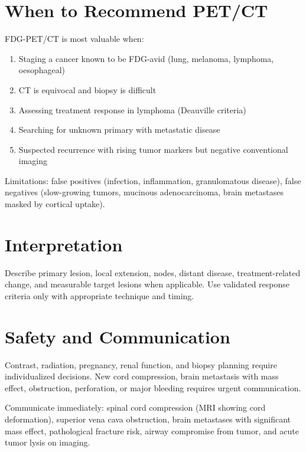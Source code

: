 \section{When to Recommend PET/CT}
FDG-PET/CT is most valuable when:
\begin{enumerate}
  \item Staging a cancer known to be FDG-avid (lung, melanoma, lymphoma, oesophageal)
  \item CT is equivocal and biopsy is difficult
  \item Assessing treatment response in lymphoma (Deauville criteria)
  \item Searching for unknown primary with metastatic disease
  \item Suspected recurrence with rising tumor markers but negative conventional imaging
\end{enumerate}

Limitations: false positives (infection, inflammation, granulomatous disease), false negatives (slow-growing tumors, mucinous adenocarcinoma, brain metastases masked by cortical uptake).

\section{Interpretation}
Describe primary lesion, local extension, nodes, distant disease, treatment-related change, and measurable target lesions when applicable. Use validated response criteria only with appropriate technique and timing.

\section{Safety and Communication}
Contrast, radiation, pregnancy, renal function, and biopsy planning require individualized decisions. New cord compression, brain metastasis with mass effect, obstruction, perforation, or major bleeding requires urgent communication.

\begin{pearlbox}
Communicate immediately: spinal cord compression (MRI showing cord deformation), superior vena cava obstruction, brain metastases with significant mass effect, pathological fracture risk, airway compromise from tumor, and acute tumor lysis on imaging.
\end{pearlbox}

\clearpage
